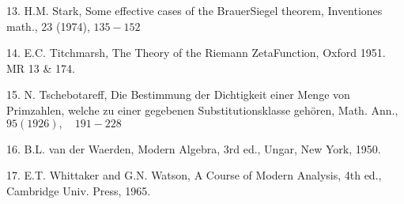 13. H.M. Stark, Some effective cases of the BrauerSiegel theorem, Inventiones math., 23 (1974), $135-152$

14. E.C. Titchmarsh, The Theory of the Riemann ZetaFunction, Oxford 1951. MR 13 \& 174.

15. N. Tschebotareff, Die Bestimmung der Dichtigkeit einer Menge von Primzahlen, welche zu einer gegebenen Substitutionsklasse gehören, Math. Ann., $95(1926), \quad 191-228$

16. B.L. van der Waerden, Modern Algebra, 3rd ed., Ungar, New York, 1950.

17. E.T. Whittaker and G.N. Watson, A Course of Modern Analysis, 4th ed., Cambridge Univ. Press, 1965.